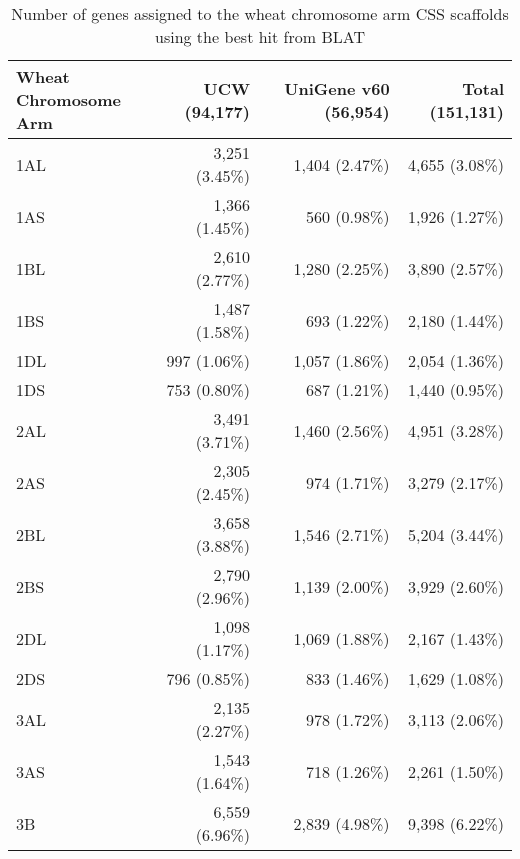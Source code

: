 \begin{table}
\centering
\caption{ Number of genes assigned to the wheat chromosome arm CSS scaffolds \citep{Mayer2014} using the best hit from BLAT \citep{Kent2002} }
\label{tab:yr15:genesToCSS}
\begin{localsize}{10}{12}
\begin{tabular}{lrrr}
\toprule
 \pbox{2.2cm}{Wheat \\Chromosome Arm}    & UCW (94,177)    & UniGene v60 (56,954)   & Total (151,131)   \\
\midrule
 1AL                     & 3,251 (3.45\%)   & 1,404 (2.47\%)          & 4,655 (3.08\%)     \\
 1AS                     & 1,366 (1.45\%)   & 560 (0.98\%)            & 1,926 (1.27\%)     \\
 1BL                     & 2,610 (2.77\%)   & 1,280 (2.25\%)          & 3,890 (2.57\%)     \\
 1BS                     & 1,487 (1.58\%)   & 693 (1.22\%)            & 2,180 (1.44\%)     \\
 1DL                     & 997 (1.06\%)     & 1,057 (1.86\%)          & 2,054 (1.36\%)     \\
 1DS                     & 753 (0.80\%)     & 687 (1.21\%)            & 1,440 (0.95\%)     \\
 \midrule
 2AL                     & 3,491 (3.71\%)   & 1,460 (2.56\%)          & 4,951 (3.28\%)     \\
 2AS                     & 2,305 (2.45\%)   & 974 (1.71\%)            & 3,279 (2.17\%)     \\
 2BL                     & 3,658 (3.88\%)   & 1,546 (2.71\%)          & 5,204 (3.44\%)     \\
 2BS                     & 2,790 (2.96\%)   & 1,139 (2.00\%)          & 3,929 (2.60\%)     \\
 2DL                     & 1,098 (1.17\%)   & 1,069 (1.88\%)          & 2,167 (1.43\%)     \\
 2DS                     & 796 (0.85\%)     & 833 (1.46\%)            & 1,629 (1.08\%)     \\
 \midrule
 3AL                     & 2,135 (2.27\%)   & 978 (1.72\%)            & 3,113 (2.06\%)     \\
 3AS                     & 1,543 (1.64\%)   & 718 (1.26\%)            & 2,261 (1.50\%)     \\
 3B                      & 6,559 (6.96\%)   & 2,839 (4.98\%)          & 9,398 (6.22\%)     \\

\end{tabular}
\end{localsize}
\end{table}
